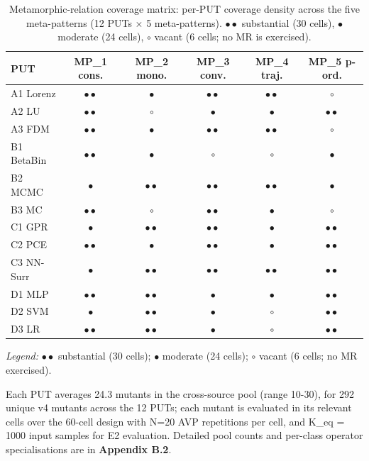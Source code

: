 \documentclass[12pt]{article}
\begin{document}
{\def\LTcaptype{table}
\small
\begin{longtable}[]{@{}lccccc@{}}
\caption{Metamorphic-relation coverage matrix: per-PUT coverage density across the five meta-patterns (12 PUTs $\times$ 5 meta-patterns). $\bullet\bullet$ substantial (30 cells), $\bullet$ moderate (24 cells), $\circ$ vacant (6 cells; no MR is exercised).}\label{tab:p2-cells}\\
\toprule\noalign{}
PUT & MP\_1 cons. & MP\_2 mono. & MP\_3 conv. & MP\_4 traj. & MP\_5 p-ord. \\
\midrule\noalign{}
\endfirsthead
\endhead
\bottomrule\noalign{}
\endlastfoot
A1 Lorenz  & $\bullet\bullet$ & $\bullet$ & $\bullet\bullet$ & $\bullet\bullet$ & $\circ$ \\
A2 LU      & $\bullet\bullet$ & $\circ$ & $\bullet$ & $\bullet$ & $\bullet\bullet$ \\
A3 FDM     & $\bullet\bullet$ & $\bullet$ & $\bullet\bullet$ & $\bullet\bullet$ & $\circ$ \\
B1 BetaBin & $\bullet\bullet$ & $\bullet$ & $\circ$ & $\circ$ & $\bullet$ \\
B2 MCMC    & $\bullet$ & $\bullet\bullet$ & $\bullet\bullet$ & $\bullet\bullet$ & $\bullet$ \\
B3 MC      & $\bullet\bullet$ & $\circ$ & $\bullet\bullet$ & $\bullet$ & $\circ$ \\
C1 GPR     & $\bullet$ & $\bullet\bullet$ & $\bullet\bullet$ & $\bullet$ & $\bullet\bullet$ \\
C2 PCE     & $\bullet\bullet$ & $\bullet$ & $\bullet\bullet$ & $\bullet$ & $\bullet\bullet$ \\
C3 NN-Surr & $\bullet$ & $\bullet\bullet$ & $\bullet\bullet$ & $\bullet\bullet$ & $\bullet\bullet$ \\
D1 MLP     & $\bullet\bullet$ & $\bullet\bullet$ & $\bullet$ & $\bullet$ & $\bullet\bullet$ \\
D2 SVM     & $\bullet$ & $\bullet\bullet$ & $\bullet$ & $\circ$ & $\bullet\bullet$ \\
D3 LR      & $\bullet\bullet$ & $\bullet\bullet$ & $\bullet$ & $\circ$ & $\bullet\bullet$ \\
\end{longtable}
}

\noindent\emph{Legend:} $\bullet\bullet$ substantial (30 cells); $\bullet$ moderate (24 cells); $\circ$ vacant (6 cells; no MR exercised).

Each PUT averages 24.3 mutants in the cross-source pool (range
10-30), for 292 unique v4 mutants across the 12 PUTs; each mutant is
evaluated in its relevant cells over the 60-cell design with N=20 AVP
repetitions per cell, and K\_eq = 1000 input samples for E2 evaluation. Detailed
pool counts and per-class operator specialisations are in
\textbf{Appendix B.2}.
\end{document}
